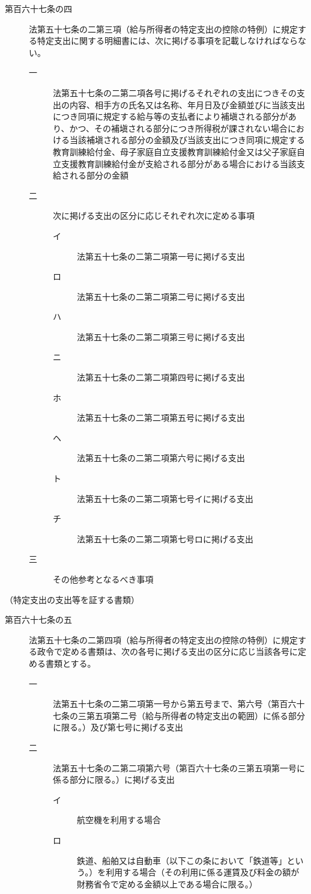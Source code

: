 \documentclass[twocolumn,a4j,10pt]{ltjtarticle}
\begin{document}
\begin{description}
\item[第百六十七条の四]法第五十七条の二第三項（給与所得者の特定支出の控除の特例）に規定する特定支出に関する明細書には、次に掲げる事項を記載しなければならない。
\begin{description}
\item[一]法第五十七条の二第二項各号に掲げるそれぞれの支出につきその支出の内容、相手方の氏名又は名称、年月日及び金額並びに当該支出につき同項に規定する給与等の支払者により補塡される部分があり、かつ、その補塡される部分につき所得税が課されない場合における当該補塡される部分の金額及び当該支出につき同項に規定する教育訓練給付金、母子家庭自立支援教育訓練給付金又は父子家庭自立支援教育訓練給付金が支給される部分がある場合における当該支給される部分の金額
\item[二]次に掲げる支出の区分に応じそれぞれ次に定める事項
\begin{description}
\item[イ]法第五十七条の二第二項第一号に掲げる支出
\item[ロ]法第五十七条の二第二項第二号に掲げる支出
\item[ハ]法第五十七条の二第二項第三号に掲げる支出
\item[ニ]法第五十七条の二第二項第四号に掲げる支出
\item[ホ]法第五十七条の二第二項第五号に掲げる支出
\item[ヘ]法第五十七条の二第二項第六号に掲げる支出
\item[ト]法第五十七条の二第二項第七号イに掲げる支出
\item[チ]法第五十七条の二第二項第七号ロに掲げる支出
\end{description}
\item[三]その他参考となるべき事項
\end{description}
\end{description}
\noindent\hspace{10pt}（特定支出の支出等を証する書類）
\begin{description}
\item[第百六十七条の五]法第五十七条の二第四項（給与所得者の特定支出の控除の特例）に規定する政令で定める書類は、次の各号に掲げる支出の区分に応じ当該各号に定める書類とする。
\begin{description}
\item[一]法第五十七条の二第二項第一号から第五号まで、第六号（第百六十七条の三第五項第二号（給与所得者の特定支出の範囲）に係る部分に限る。）及び第七号に掲げる支出
\item[二]法第五十七条の二第二項第六号（第百六十七条の三第五項第一号に係る部分に限る。）に掲げる支出
\begin{description}
\item[イ]航空機を利用する場合
\item[ロ]鉄道、船舶又は自動車（以下この条において「鉄道等」という。）を利用する場合（その利用に係る運賃及び料金の額が財務省令で定める金額以上である場合に限る。）
\end{description}
\end{description}
\end{description}
\end{document}
